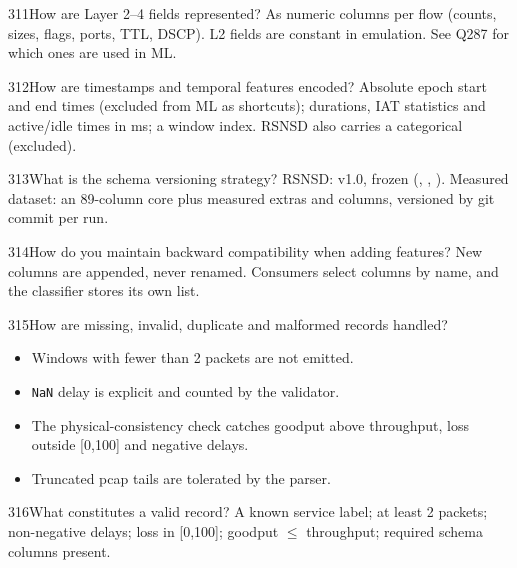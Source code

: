 \begin{qa}{311}{How are Layer 2--4 fields represented?}
As numeric columns per flow (counts, sizes, flags, ports, TTL, DSCP). L2 fields are constant in emulation. See
Q287 for which ones are used in ML.
\end{qa}

\begin{qa}{312}{How are timestamps and temporal features encoded?}
Absolute epoch start and end times (excluded from ML as shortcuts); durations, IAT statistics and active/idle times in
ms; a window index. RSNSD also carries a categorical  (excluded).
\end{qa}

\begin{qa}{313}{What is the schema versioning strategy?}
RSNSD: v1.0, frozen (, , ). Measured dataset: an
89-column core plus measured extras and  columns, versioned by git commit per run.
\end{qa}

\begin{qa}{314}{How do you maintain backward compatibility when adding features?}
New columns are appended, never renamed. Consumers select columns by name, and the classifier stores its own list.
\end{qa}

\begin{qa}{315}{How are missing, invalid, duplicate and malformed records handled?}
\begin{itemize}
\item Windows with fewer than 2 packets are not emitted.
\item \texttt{NaN} delay is explicit and counted by the validator.
\item The physical-consistency check catches goodput above throughput, loss outside [0,100] and negative delays.
\item Truncated pcap tails are tolerated by the parser.
\end{itemize}
\end{qa}

\begin{qa}{316}{What constitutes a valid record?}
A known service label; at least 2 packets; non-negative delays; loss in [0,100]; goodput $\le$ throughput; required
schema columns present.
\end{qa}


